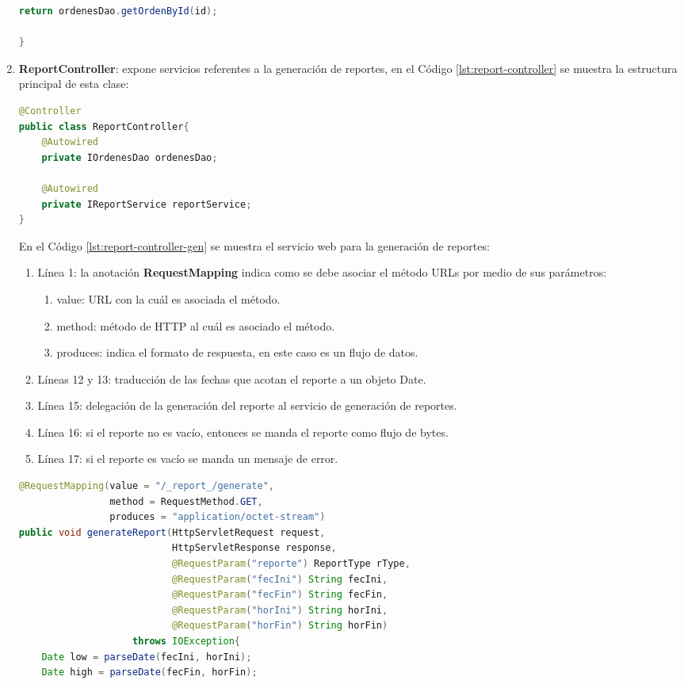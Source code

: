 \begin{enumerate}
\begin{lstlisting}[language=Java, caption={Servicio Web para obtener una orden de reposición.}, captionpos=b, label={lst:get-orden-data-controller}]
	return ordenesDao.getOrdenById(id);

}
\end{lstlisting}

	\item \textbf{ReportController}: expone servicios referentes a la generación de reportes, en el Código \ref{lst:report-controller} se muestra la estructura principal de esta clase:
\begin{lstlisting}[language=Java, caption={Controlador para exponer servicios Web de generación de reportes.}, captionpos=b, label={lst:report-controller}]
@Controller
public class ReportController{
	@Autowired
	private IOrdenesDao ordenesDao;
	
	@Autowired
	private IReportService reportService;
}
\end{lstlisting}

	En el Código \ref{lst:report-controller-gen} se muestra el servicio web para la generación de reportes:
	\begin{enumerate}
		\item Línea 1: la anotación \textbf{RequestMapping} indica como se debe asociar el método URLs por medio de sus parámetros:
		\begin{enumerate}
			\item value: URL con la cuál es asociada el método.
			\item method: método de HTTP al cuál es asociado el método.
			\item produces: indica el formato de respuesta, en este caso es un flujo de datos.
		\end{enumerate}
		\item Líneas 12 y 13: traducción de las fechas que acotan el reporte a un objeto Date.
		\item Línea 15: delegación de la generación del reporte al servicio de generación de reportes.
		\item Línea 16: si el reporte no es vacío, entonces se manda el reporte como flujo de bytes.
		\item Línea 17: si el reporte es vacío se manda un mensaje de error.
	\end{enumerate}

\begin{lstlisting}[language=Java, caption={Servicio Web para generar un reporte.}, captionpos=b, label={lst:report-controller-gen}]
@RequestMapping(value = "/_report_/generate",
				method = RequestMethod.GET,
				produces = "application/octet-stream")
public void generateReport(HttpServletRequest request,
						   HttpServletResponse response,
						   @RequestParam("reporte") ReportType rType,
						   @RequestParam("fecIni") String fecIni,
						   @RequestParam("fecFin") String fecFin,
						   @RequestParam("horIni") String horIni,
						   @RequestParam("horFin") String horFin)
					throws IOException{
	Date low = parseDate(fecIni, horIni);
	Date high = parseDate(fecFin, horFin);
	

\end{lstlisting}
\end{enumerate}

